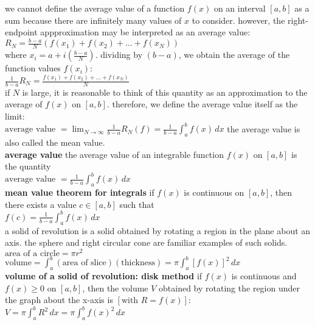 \documentclass{article}
\begin{document}
we cannot define the average value of a function $f(x)$ on an interval $[a, b]$ as a sum because there are infinitely many values of $x$ to consider. however, the right-endpoint appproximation may be interpreted as an average value:\\
$R_N = \frac{b - a}{N}(f(x_1) + f(x_2) + \ldots + f(x_N))$\\
where $x_i = a + i(\frac{b - a}{N})$. dividing by $(b - a)$, we obtain the average of the function values $f(x_i)$:\\
$\frac{1}{b - a}R_N = \frac{f(x_1) + f(x_2) + \ldots + f(x_N)}{N}$\\
if $N$ is large, it is reasonable to think of this quantity as an approximation to the average of $f(x)$ on $[a, b]$. therefore, we define the average value itself as the limit:\\

$\text{average value } = \lim_{N \to \infty}\frac{1}{b - a}R_N(f) = \frac{1}{b - a}\int_{a}^{b}f(x)\,dx$ the average value is also called the mean value.\\

\textbf{average value} the average value of an integrable function $f(x)$ on $[a, b]$ is the quantity\\ $\text{average value } = \frac{1}{b - a}\int_{a}^{b}f(x)\,dx$\\

\textbf{mean value theorem for integrals} if $f(x)$ is continuous on $[a, b]$, then there exists a value $c \in [a, b]$ such that\\ $f(c) = \frac{1}{b - a}\int_{a}^{b}f(x)\,dx$\\

a solid of revolution is a solid obtained by rotating a region in the plane about an axis. the sphere and right circular cone are familiar examples of such solids.\\

$\text{area of a circle} = \pi r^2$\\
$\text{volume} = \int_{a}^{b}(\text{area of slice})(\text{thickness}) = \pi\int_{a}^{b}[f(x)]^2\,dx$\\

\textbf{volume of a solid of revolution: disk method} if $f(x)$ is continuous and $f(x) \geq 0$ on $[a, b]$, then the volume $V$ obtained by rotating the region under the graph about the x-axis is $[\text{with } R = f(x)]$:\\ $V = \pi\int_{a}^{b}R^2\,dx = \pi\int_{a}^{b}f(x)^2\,dx$\\
\end{document}
